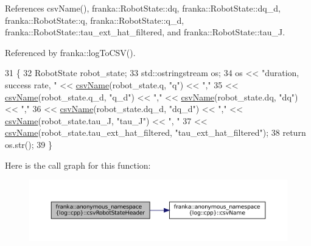 References csv\+Name(), franka\+::\+Robot\+State\+::dq, franka\+::\+Robot\+State\+::dq\+\_\+d, franka\+::\+Robot\+State\+::q, franka\+::\+Robot\+State\+::q\+\_\+d, franka\+::\+Robot\+State\+::tau\+\_\+ext\+\_\+hat\+\_\+filtered, and franka\+::\+Robot\+State\+::tau\+\_\+J.



Referenced by franka\+::log\+To\+C\+S\+V().


\begin{DoxyCode}
31                                 \{
32   RobotState robot\_state;
33   std::ostringstream os;
34   os << \textcolor{stringliteral}{"duration, success rate, "} << \hyperlink{namespacefranka_1_1anonymous__namespace_02log_8cpp_03_afa84e09d4799d45ad094a8e4c2ad4c72}{csvName}(robot\_state.q, \textcolor{stringliteral}{"q"}) << \textcolor{stringliteral}{","}
35      << \hyperlink{namespacefranka_1_1anonymous__namespace_02log_8cpp_03_afa84e09d4799d45ad094a8e4c2ad4c72}{csvName}(robot\_state.q\_d, \textcolor{stringliteral}{"q\_d"}) << \textcolor{stringliteral}{","} << \hyperlink{namespacefranka_1_1anonymous__namespace_02log_8cpp_03_afa84e09d4799d45ad094a8e4c2ad4c72}{csvName}(robot\_state.dq, \textcolor{stringliteral}{"dq"}) << \textcolor{stringliteral}{","}
36      << \hyperlink{namespacefranka_1_1anonymous__namespace_02log_8cpp_03_afa84e09d4799d45ad094a8e4c2ad4c72}{csvName}(robot\_state.dq\_d, \textcolor{stringliteral}{"dq\_d"}) << \textcolor{stringliteral}{","} << \hyperlink{namespacefranka_1_1anonymous__namespace_02log_8cpp_03_afa84e09d4799d45ad094a8e4c2ad4c72}{csvName}(robot\_state.tau\_J, \textcolor{stringliteral}{"tau\_J"}) << \textcolor{stringliteral}{",
      "}
37      << \hyperlink{namespacefranka_1_1anonymous__namespace_02log_8cpp_03_afa84e09d4799d45ad094a8e4c2ad4c72}{csvName}(robot\_state.tau\_ext\_hat\_filtered, \textcolor{stringliteral}{"tau\_ext\_hat\_filtered"});
38   \textcolor{keywordflow}{return} os.str();
39 \}
\end{DoxyCode}
Here is the call graph for this function\+:
\nopagebreak
\begin{figure}[H]
\begin{center}
\leavevmode
\includegraphics[width=350pt]{namespacefranka_1_1anonymous__namespace_02log_8cpp_03_a6de657d62964bab6ee389fd7be7b639f_cgraph}
\end{center}
\end{figure}
